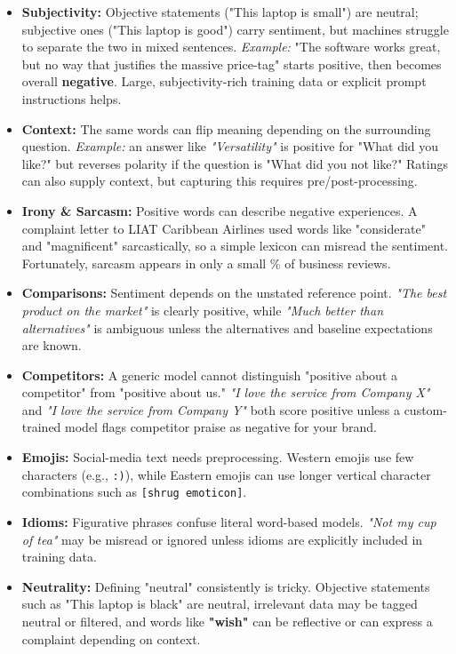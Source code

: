 \documentclass[12pt,openany]{book}
\begin{document}
\begin{itemize}[leftmargin=*]
    \item \textbf{Subjectivity:} Objective statements ("This laptop is small") are neutral; subjective ones ("This laptop is good") carry sentiment, but machines struggle to separate the two in mixed sentences. \textit{Example:} "The software works great, but no way that justifies the massive price-tag" starts positive, then becomes overall \textbf{negative}. Large, subjectivity-rich training data or explicit prompt instructions helps.
    \item \textbf{Context:} The same words can flip meaning depending on the surrounding question. \textit{Example:} an answer like \textit{"Versatility"} is positive for "What did you like?" but reverses polarity if the question is "What did you not like?" Ratings can also supply context, but capturing this requires pre/post-processing.
    \item \textbf{Irony \& Sarcasm:} Positive words can describe negative experiences. A complaint letter to LIAT Caribbean Airlines used words like "considerate" and "magnificent" sarcastically, so a simple lexicon can misread the sentiment. Fortunately, sarcasm appears in only a small \% of business reviews.
    \item \textbf{Comparisons:} Sentiment depends on the unstated reference point. \textit{"The best product on the market"} is clearly positive, while \textit{"Much better than alternatives"} is ambiguous unless the alternatives and baseline expectations are known.
    \item \textbf{Competitors:} A generic model cannot distinguish "positive about a competitor" from "positive about us." \textit{"I love the service from Company X"} and \textit{"I love the service from Company Y"} both score positive unless a custom-trained model flags competitor praise as negative for your brand.
    \item \textbf{Emojis:} Social-media text needs preprocessing. Western emojis use few characters (e.g., \texttt{:)}), while Eastern emojis can use longer vertical character combinations such as \texttt{[shrug emoticon]}.
    \item \textbf{Idioms:} Figurative phrases confuse literal word-based models. \textit{"Not my cup of tea"} may be misread or ignored unless idioms are explicitly included in training data.
    \item \textbf{Neutrality:} Defining "neutral" consistently is tricky. Objective statements such as "This laptop is black" are neutral, irrelevant data may be tagged neutral or filtered, and words like \textbf{"wish"} can be reflective or can express a complaint depending on context.

\end{itemize}
\end{document}
